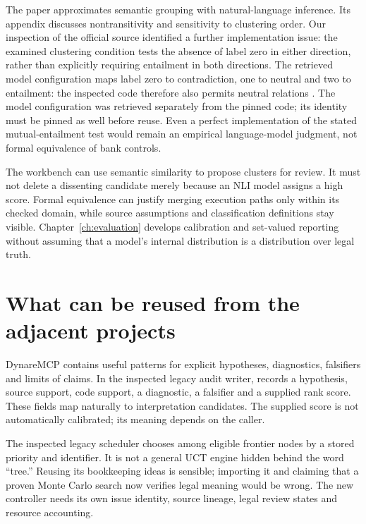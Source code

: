 \documentclass[12pt,a4paper,oneside,openany]{book}
\newcommand{\srcpath}[1]{\path{#1}}
\begin{document}
The paper approximates semantic grouping with natural-language inference. Its
appendix discusses nontransitivity and sensitivity to clustering order. Our
inspection of the official source identified a further implementation issue: the
examined clustering condition tests the absence of label zero in either direction,
rather than explicitly requiring entailment in both directions. The retrieved model configuration maps label zero to contradiction, one to
neutral and two to entailment: the inspected code therefore also permits neutral
relations \citep{semanticcode2023,debertaconfig}. The model configuration was retrieved separately from the pinned code;
its identity must be pinned as well before reuse. Even a
perfect implementation of the stated mutual-entailment test would remain an
empirical language-model judgment, not formal equivalence of bank controls.

The workbench can use semantic similarity to propose clusters for review. It
must not delete a dissenting candidate merely because an NLI model assigns a
high score. Formal equivalence can justify merging execution paths only within
its checked domain, while source assumptions and classification definitions stay
visible. Chapter~\ref{ch:evaluation} develops calibration and set-valued reporting
without assuming that a model's internal distribution is a distribution over
legal truth.

\section{What can be reused from the adjacent projects}
\label{merge:M05:10}


DynareMCP contains useful patterns for explicit hypotheses, diagnostics,
falsifiers and limits of claims. In the inspected legacy audit writer,
\srcpath{write_hypothesis_node} records a hypothesis, source support, code support,
a diagnostic, a falsifier and a supplied rank score. These fields map naturally
to interpretation candidates. The supplied score is not automatically calibrated;
its meaning depends on the caller.

The inspected legacy scheduler chooses among eligible frontier nodes by a stored
priority and identifier. It is not a general UCT engine hidden behind the word
``tree.'' Reusing its bookkeeping ideas is sensible; importing it and claiming
that a proven Monte Carlo search now verifies legal meaning would be wrong. The
new controller needs its own issue identity, source lineage, legal review states
and resource accounting.
\end{document}
